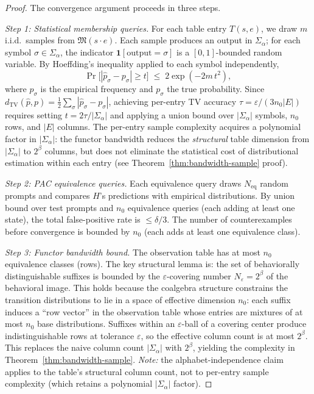 \documentclass[11pt]{article}
\begin{document}
\begin{proof}
The convergence argument proceeds in three steps.

\emph{Step 1: Statistical membership queries.}
For each table entry $T(s, e)$, we draw $m$ i.i.d.\ samples from
$\mathfrak{M}(s \cdot e)$.  Each sample produces an output in
$\Sigma_\alpha$; for each symbol $\sigma \in \Sigma_\alpha$, the
indicator $\mathbf{1}[\text{output} = \sigma]$ is a $[0,1]$-bounded
random variable.  By Hoeffding's inequality applied to each symbol
independently,
\[
  \Pr\!\bigl[|\hat{p}_\sigma - p_\sigma| \ge t\bigr]
  \;\le\; 2 \exp(-2m\,t^2),
\]
where $\hat{p}_\sigma$ is the empirical frequency and $p_\sigma$ the
true probability.  Since $d_{\mathrm{TV}}(\hat{p}, p) = \frac{1}{2}
\sum_\sigma |\hat{p}_\sigma - p_\sigma|$, achieving per-entry TV
accuracy $\tau = \varepsilon/(3 n_0 |E|)$ requires setting
$t = 2\tau / |\Sigma_\alpha|$ and applying a union bound over
$|\Sigma_\alpha|$ symbols, $n_0$ rows, and $|E|$ columns.
The per-entry sample complexity acquires a polynomial factor in
$|\Sigma_\alpha|$: the functor bandwidth reduces the \emph{structural}
table dimension from $|\Sigma_\alpha|$ to $2^\beta$ columns, but
does not eliminate the statistical cost of distributional estimation
within each entry (see Theorem~\ref{thm:bandwidth-sample} proof).

\emph{Step 2: PAC equivalence queries.}
Each equivalence query draws $N_{\mathrm{eq}}$ random prompts and
compares $H$'s predictions with empirical distributions.  By union
bound over test prompts and $n_0$ equivalence queries (each adding
at least one state), the total false-positive rate is $\le \delta/3$.
The number of counterexamples before convergence is bounded by $n_0$
(each adds at least one equivalence class).

\emph{Step 3: Functor bandwidth bound.}
The observation table has at most $n_0$ equivalence classes (rows).
The key structural lemma is: the set of behaviorally distinguishable
suffixes is bounded by the $\varepsilon$-covering number
$N_\varepsilon = 2^\beta$ of the behavioral image.  This holds because
the coalgebra structure constrains the transition distributions to
lie in a space of effective dimension $n_0$: each suffix induces a
``row vector'' in the observation table whose entries are mixtures
of at most $n_0$ base distributions.
Suffixes within an $\varepsilon$-ball of a covering center produce
indistinguishable rows at tolerance $\varepsilon$, so the effective
column count is at most $2^\beta$.  This replaces the naive column
count $|\Sigma_\alpha|$ with $2^\beta$, yielding the complexity in
Theorem~\ref{thm:bandwidth-sample}.
\emph{Note:} the alphabet-independence claim applies to the table's
structural column count, not to per-entry sample complexity
(which retains a polynomial $|\Sigma_\alpha|$ factor).


\end{proof}
\end{document}
